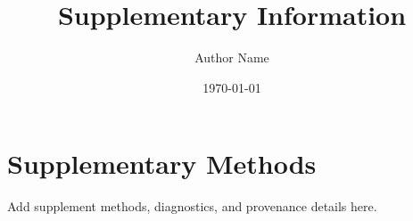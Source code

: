 \documentclass[11pt]{article}
\title{Supplementary Information}
\author{Author Name}
\date{\today}
\begin{document}
\maketitle

\section{Supplementary Methods}

Add supplement methods, diagnostics, and provenance details here.



\end{document}
